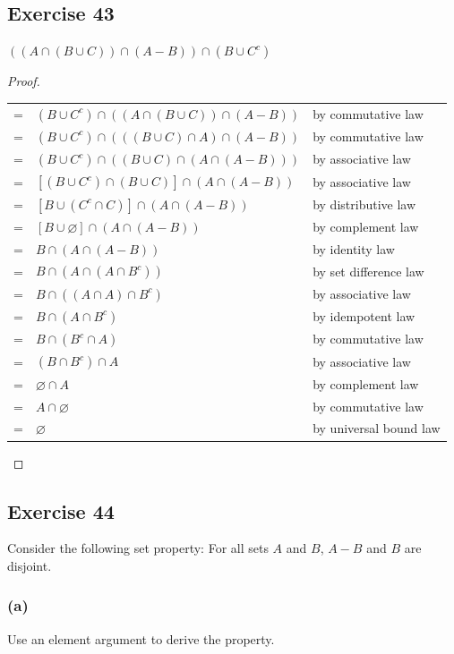 \documentclass[14pt]{extarticle}
\newcommand{\es}{\varnothing}
\newcommand{\cy}{\color{cyan}}
\begin{document}
\subsection{Exercise 43}
\(((A \cap (B \cup C)) \cap (A - B)) \cap (B \cup C^c)\)

\begin{proof}
\begin{center}
\begin{tabular}{cll}
= & \((B \cup C^c) \cap ((A \cap (B \cup C)) \cap (A - B)) \) & {\cy by commutative law} \\
= & \((B \cup C^c) \cap (((B \cup C) \cap A) \cap (A - B)) \) & {\cy by commutative law} \\
= & \((B \cup C^c) \cap ((B \cup C) \cap (A \cap (A - B))) \) & {\cy by associative law} \\
= & \([(B \cup C^c) \cap (B \cup C)] \cap (A \cap (A - B)) \) & {\cy by associative law} \\
= & \([B \cup (C^c \cap C)] \cap (A \cap (A - B)) \) & {\cy by distributive law} \\
= & \([B \cup \es] \cap (A \cap (A - B)) \) & {\cy by complement law} \\
= & \(B \cap (A \cap (A - B)) \) & {\cy by identity law} \\
= & \(B \cap (A \cap (A \cap B^c)) \) & {\cy by set difference law} \\
= & \(B \cap ((A \cap A) \cap B^c) \) & {\cy by associative law} \\
= & \(B \cap (A \cap B^c) \) & {\cy by idempotent law} \\
= & \(B \cap (B^c \cap A) \) & {\cy by commutative law} \\
= & \((B \cap B^c) \cap A \) & {\cy by associative law} \\
= & \(\es \cap A\) & {\cy by complement law} \\
= & \(A \cap \es\) & {\cy by commutative law} \\
= & \(\es\) & {\cy by universal bound law}
\end{tabular}
\end{center}
\end{proof}

\subsection{Exercise 44}
Consider the following set property: For all sets $A$ and $B$, $A - B$ and $B$ are disjoint.

\subsubsection{(a)}
Use an element argument to derive the property.
\end{document}
